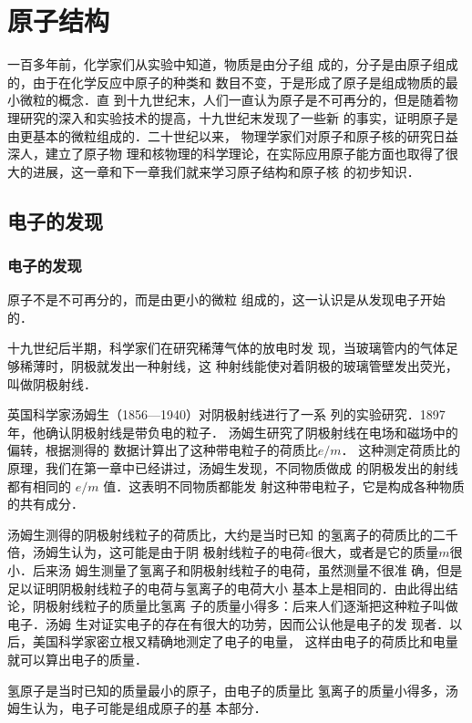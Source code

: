 \chapter{原子结构}\label{chapter-atomic-structure}

一百多年前，化学家们从实验中知道，物质是由分子组
成的，分子是由原子组成的，由于在化学反应中原子的种类和
数目不变，于是形成了原子是组成物质的最小微粒的概念．直
到十九世纪末，人们一直认为原子是不可再分的，但是随着物
理研究的深入和实验技术的提高，十九世纪末发现了一些新
的事实，证明原子是由更基本的微粒组成的．二十世纪以来，
物理学家们对原子和原子核的研究日益深人，建立了原子物
理和核物理的科学理论，在实际应用原子能方面也取得了很
大的进展，这一章和下一章我们就来学习原子结构和原子核
的初步知识．


\section{电子的发现}
\subsection{电子的发现}


原子不是不可再分的，而是由更小的微粒
组成的，这一认识是从发现电子开始的．

十九世纪后半期，科学家们在研究稀薄气体的放电时发
现，当玻璃管内的气体足够稀薄时，阴极就发出一种射线，这
种射线能使对着阴极的玻璃管壁发出荧光，叫做阴极射线．

英国科学家汤姆生（1856—1940）对阴极射线进行了一系
列的实验研究．1897年，他确认阴极射线是带负电的粒子．
汤姆生研究了阴极射线在电场和磁场中的偏转，根据测得的
数据计算出了这种带电粒子的荷质比$e/m$．
这种测定荷质比的
原理，我们在第一章中已经讲过，汤姆生发现，不同物质做成
的阴极发出的射线都有相同的
$e/m$
值．这表明不同物质都能发
射这种带电粒子，它是构成各种物质的共有成分．

汤姆生测得的阴极射线粒子的荷质比，大约是当时已知
的氢离子的荷质比的二千倍，汤姆生认为，这可能是由于阴
极射线粒子的电荷$e$很大，或者是它的质量$m$很小．后来汤
姆生测量了氢离子和阴极射线粒子的电荷，虽然测量不很准
确，但是足以证明阴极射线粒子的电荷与氢离子的电荷大小
基本上是相同的．由此得出结论，阴极射线粒子的质量比氢离
子的质量小得多：后来人们逐渐把这种粒子叫做电子．汤姆
生对证实电子的存在有很大的功劳，因而公认他是电子的发
现者．以后，美国科学家密立根又精确地测定了电子的电量，
这样由电子的荷质比和电量就可以算出电子的质量．

氢原子是当时已知的质量最小的原子，由电子的质量比
氢离子的质量小得多，汤姆生认为，电子可能是组成原子的基
本部分．

